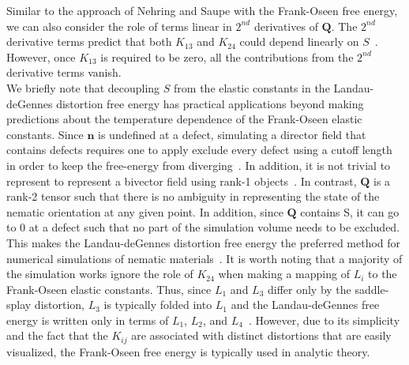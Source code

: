 Similar to the approach of Nehring and Saupe with the Frank-Oseen free energy, we can also consider the role of terms linear in $2^{nd}$ derivatives of $\mathbf{Q}$.
The $2^{nd}$ derivative terms predict that both $K_{13}$ and $K_{24}$ could depend linearly on $S$~\cite{RN58}.
However, once $K_{13}$ is required to be zero, all the contributions from the $2^{nd}$ derivative terms vanish.\\


We briefly note that decoupling $S$ from the elastic constants in the Landau-deGennes distortion free energy has practical applications beyond making predictions about the temperature dependence of the Frank-Oseen elastic constants.
Since $\mathbf{n}$ is undefined at a defect, simulating a director field that contains defects requires one to apply exclude every defect using a cutoff length in order to keep the free-energy from diverging~.
In addition, it is not trivial to represent to represent a bivector field using rank-1 objects~.
In contrast, $\mathbf{Q}$ is a rank-2 tensor such that there is no ambiguity in representing the state of the nematic orientation at any given point.
In addition, since $\mathbf{Q}$ contains S, it can go to 0 at a defect such that no part of the simulation volume needs to be excluded.
This makes the Landau-deGennes distortion free energy the preferred method for numerical simulations of nematic materials~\cite{RN190}.
It is worth noting that a majority of the simulation works ignore the role of $K_{24}$ when making a mapping of $L_i$ to the Frank-Oseen elastic constants.
Thus, since $L_1$ and $L_3$ differ only by the saddle-splay distortion, $L_3$ is typically folded into $L_1$ and the Landau-deGennes free energy is written only in terms of $L_1$, $L_2$, and $L_4$~\cite{RN198,RN190}.
However, due to its simplicity and the fact that the $K_{ij}$ are associated with distinct distortions that are easily visualized, the Frank-Oseen free energy is typically used in analytic theory.\\


